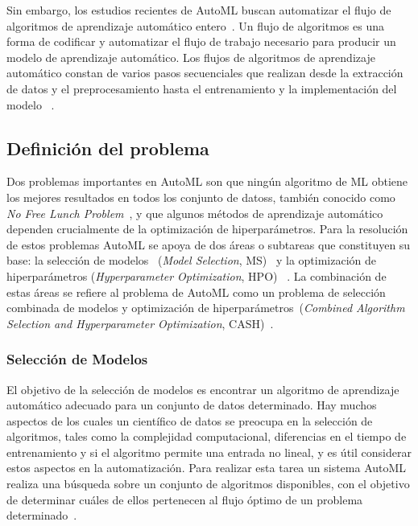 Sin embargo, los estudios recientes de AutoML buscan automatizar el flujo de
algoritmos de aprendizaje automático entero~. Un flujo de algoritmos es una forma de codificar y
automatizar el flujo de trabajo necesario para producir un modelo de
aprendizaje automático. Los flujos de algoritmos de aprendizaje automático
constan de varios pasos secuenciales que realizan desde la extracción de datos
y el preprocesamiento hasta el entrenamiento y la implementación del modelo
~.

\subsection{Definición del problema}\label{subsec:automl_problem_definition}

Dos problemas importantes en AutoML son que ningún algoritmo de ML obtiene los
mejores resultados en todos los conjunto de datoss, también conocido como
\textit{No Free Lunch Problem}~, y que algunos métodos de
aprendizaje automático dependen crucialmente de la optimización de
hiperparámetros. Para la resolución de estos problemas AutoML se apoya de dos
áreas o subtareas que constituyen su base: la selección de modelos~
(\textit{Model Selection}, MS)~ y la optimización de
hiperparámetros (\textit{Hyperparameter Optimization}, HPO)
~. La combinación de estas áreas se refiere al
problema de AutoML como un problema de selección combinada de modelos y
optimización de hiperparámetros~(\textit{Combined Algorithm Selection and
Hyperparameter Optimization}, CASH)~.

\subsubsection{Selección de Modelos}

El objetivo de la selección de modelos es encontrar un algoritmo de aprendizaje
automático adecuado para un conjunto de datos determinado. Hay muchos aspectos de los
cuales un científico de datos se preocupa en la selección de algoritmos, tales
como la complejidad computacional, diferencias en el tiempo de entrenamiento y
si el algoritmo permite una entrada no lineal, y es útil considerar estos
aspectos en la automatización. Para realizar esta tarea un sistema AutoML
realiza una búsqueda sobre un conjunto de algoritmos disponibles, con el
objetivo de determinar cuáles de ellos pertenecen al flujo óptimo de un
problema determinado~.

